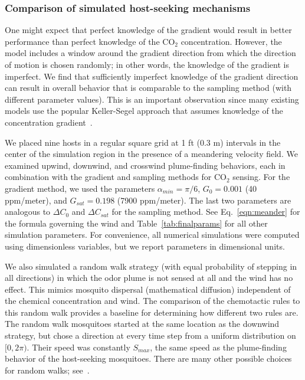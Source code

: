 \documentclass[10pt]{article}
\begin{document}
\subsubsection*{Comparison of simulated host-seeking mechanisms}

One might expect that perfect knowledge of the gradient would result in 
better performance than perfect knowledge of the CO$_2$ concentration.  However, the model 
includes a window around the gradient direction from which the direction of motion is chosen randomly; in other
words, the knowledge of the gradient is imperfect.  We find that sufficiently imperfect knowledge
of the gradient direction can result in overall behavior that is comparable to the sampling method (with
different parameter values).  This is an important observation since many existing models use the
popular Keller-Segel approach that assumes knowledge of the concentration 
gradient~\cite{KellerSegel,Hortsmann}.

We placed nine hosts in a regular square grid at 1 ft (0.3 m) intervals in the center of the simulation region in the presence of a meandering velocity field. 
We examined upwind, downwind, and crosswind plume-finding behaviors, each in combination with the gradient and sampling methods for CO$_2$ sensing. For the gradient method, we used the parameters $\alpha_{min} = \pi/6$, $G_0 = 0.001$ (40 ppm/meter), and $G_{sat}=0.198$ (7900 ppm/meter). The last two parameters are analogous to $\Delta C_0$ and $\Delta C_{sat}$ for the sampling method. See Eq.~\eqref{eqn:meander} for the formula governing the wind and Table~\ref{tab:finalparams} for all other simulation parameters. For convenience, all numerical simulations were computed using dimensionless variables, but we report parameters in dimensional units.

We also simulated a random walk strategy (with 
equal probability of stepping in all directions) in which the odor plume is not sensed at all and the wind has no effect.  This 
mimics mosquito dispersal (mathematical diffusion) independent of the chemical concentration and wind.  The comparison of the
chemotactic rules to this random walk provides a baseline for determining how different two rules are.
The random walk mosquitoes started at the same location as the downwind strategy, but chose a direction at every time step from a uniform distribution on $[0,2\pi)$. Their speed was constantly $S_{max}$, the same speed as the plume-finding behavior of the host-seeking mosquitoes. There are many other possible choices for random walks; see~\cite{Pasternak2009}.
\end{document}
